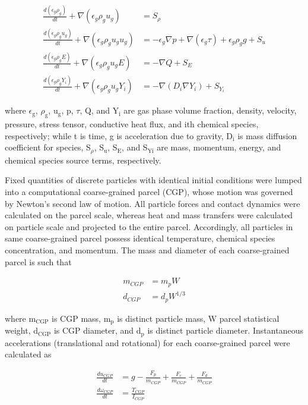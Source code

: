 \begin{align}
    \frac{d(\epsilon_g \rho_g)}{dt} + \nabla (\epsilon_g \rho_g u_g) &= S_\rho \label{eq:gas-trans-mass} \\
    \frac{d(\epsilon_g \rho_g u_g)}{dt} + \nabla (\epsilon_g \rho_g u_g u_g) &= -\epsilon_g \nabla p + \nabla (\epsilon_g \tau) + \epsilon_g \rho_g g + S_u \\
    \frac{d(\epsilon_g \rho_g E)}{dt} + \nabla (\epsilon_g \rho_g u_g E) &= -\nabla Q + S_E \\
    \frac{d(\epsilon_g \rho_g Y_i)}{dt} + \nabla (\epsilon_g \rho_g u_g Y_i) &= -\nabla (D_i \nabla Y_i) + S_{Y_i} \label{eq:gas-trans-chemical}
\end{align}

\noindent where $\epsilon_\text{g}$, $\rho_\text{g}$, u$_\text{g}$, p, $\tau$, Q, and Y$_\text{i}$ are gas phase volume fraction, density, velocity, pressure, stress tensor, conductive heat flux, and ith chemical species, respectively; while t is time, g is acceleration due to gravity, D$_\text{i}$ is mass diffusion coefficient for species, S$_\rho$, S$_\text{u}$, S$_\text{E}$, and S$_\text{Yi}$ are mass, momentum, energy, and chemical species source terms, respectively.

Fixed quantities of discrete particles with identical initial conditions were lumped into a computational coarse-grained parcel (CGP), whose motion was governed by Newton’s second law of motion. All particle forces and contact dynamics were calculated on the parcel scale, whereas heat and mass transfers were calculated on particle scale and projected to the entire parcel. Accordingly, all particles in same coarse-grained parcel possess identical temperature, chemical species concentration, and momentum. The mass and diameter of each coarse-grained parcel is such that

\begin{align}
    m_{CGP} &= m_p W \\
    d_{CGP} &= d_p W^{1/3}
\end{align}

\noindent where m$_\text{CGP}$ is CGP mass, m$_\text{p}$ is distinct particle mass, W parcel statistical weight, d$_\text{CGP}$ is CGP diameter, and d$_\text{p}$ is distinct particle diameter. Instantaneous accelerations (translational and rotational) for each coarse-grained parcel were calculated as

\begin{align}
    \frac{d u_{CGP}}{dt} &= g - \frac{F_p}{m_{CGP}} + \frac{F_c}{m_{CGP}} + \frac{F_d}{m_{CGP}} \\
    \frac{d \omega_{CGP}}{dt} &= \frac{T_{CGP}}{I_{CGP}}
\end{align}

